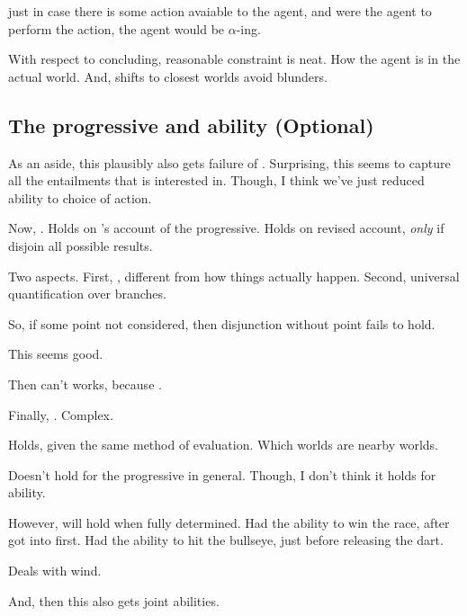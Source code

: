 \begin{note}
  \pevent{} just in case there is some action avaiable to the agent, and were the agent to perform the action, the agent would be \(\alpha\)-ing.
\end{note}

\begin{note}
  With respect to concluding, reasonable constraint is neat.
  How the agent is in the actual world.
  And, shifts to closest worlds avoid blunders.
\end{note}

\subsection[The progressive and ability]{The progressive and ability \hfill (Optional)}

\begin{note}
  As an aside, this plausibly also gets failure of \BoyVS{}.
  Surprising, this seems to capture all the entailments that \citeauthor{Boylan:2020aa} is interested in.
  Though, I think we've just reduced ability to choice of action.
\end{note}


\begin{note}
  Now, \BoyVS{}.
  Holds on \citeauthor{Landman:1992wh}'s account of the progressive.
  Holds on revised account, \emph{only} if disjoin all possible results.

  Two aspects.
  First, \AlgGetPStops{}, different from how things actually happen.
  Second, universal quantification over branches.

  So, if some point not considered, then disjunction without point fails to hold.

  This seems good.

  Then can't works, because \AlgGetPStops{}.

  Finally, \BoyPS{}.
  Complex.

  Holds, given the same method of evaluation.
  Which worlds are nearby worlds.

  Doesn't hold for the progressive in general.
  Though, I don't think it holds for ability.

  However, will hold when fully determined.
  Had the ability to win the race, after got into first.
  Had the ability to hit the bullseye, just before releasing the dart.

  Deals with wind.

  And, then this also gets joint abilities.
\end{note}


